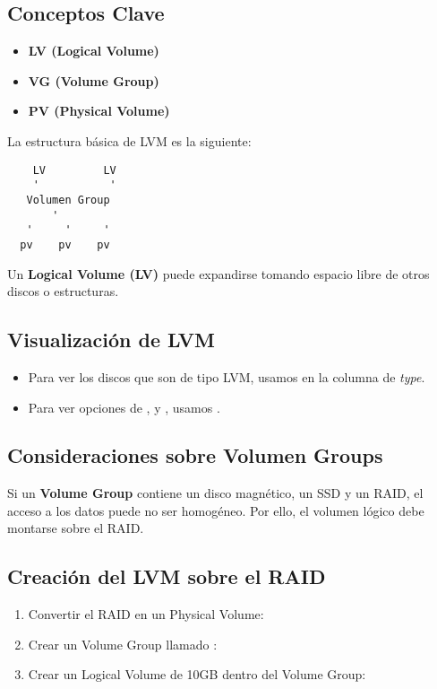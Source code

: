 \subsection{Conceptos Clave}
\begin{itemize}
    \item \textbf{LV (Logical Volume)}
    \item \textbf{VG (Volume Group)}
    \item \textbf{PV (Physical Volume)}
\end{itemize}

La estructura básica de LVM es la siguiente:

\begin{verbatim}
    LV         LV   
    '           '
   Volumen Group  
       '
   '     '     '
  pv    pv    pv  
\end{verbatim}

Un \textbf{Logical Volume (LV)} puede expandirse tomando espacio libre de otros discos o estructuras.

\subsection{Visualización de LVM}
\begin{itemize}
    \item Para ver los discos que son de tipo LVM, usamos  en la columna de \textit{type}.
    \item Para ver opciones de ,  y , usamos .
\end{itemize}

\subsection{Consideraciones sobre Volumen Groups}
Si un \textbf{Volume Group} contiene un disco magnético, un SSD y un RAID, el acceso a los datos puede no ser homogéneo. Por ello, el volumen lógico debe montarse sobre el RAID.

\subsection{Creación del LVM sobre el RAID}
\begin{enumerate}
    \item Convertir el RAID en un Physical Volume:
    \item Crear un Volume Group llamado :
    \item Crear un Logical Volume de 10GB dentro del Volume Group:
\end{enumerate}

